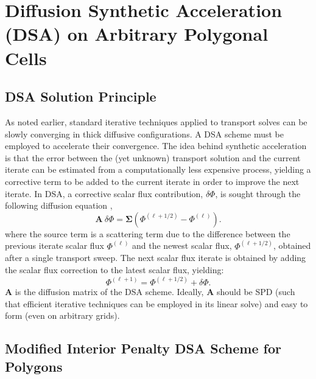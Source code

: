 \documentclass[preprint,10pt]{elsarticle}
\newcommand\bs{\boldsymbol}
\renewcommand{\(}{\left(}
\renewcommand{\)}{\right)}
\renewcommand{\[}{\left[}
\renewcommand{\]}{\right]}
\begin{document}
\section{Diffusion Synthetic Acceleration (DSA) on Arbitrary Polygonal Cells} \label{sec_mip}

\subsection{DSA Solution Principle}

As noted earlier, standard iterative techniques applied to transport solves 
can be slowly converging in thick diffusive configurations. A DSA scheme 
must be employed to accelerate their convergence.
The idea behind synthetic acceleration is that the error between the (yet
unknown) transport solution and the current iterate can be estimated from a
computationally less expensive process, yielding a corrective term to be added
to the current iterate in order to improve the next iterate. In DSA, a
corrective scalar flux contribution, $\delta \Phi$, is sought through the following 
diffusion equation \cite{dsa_ref}, 
\begin{equation}
  \bs{A}\ \delta \Phi = \bs{\Sigma}\(\Phi^{(\ell+1/2)} - \Phi^{(\ell)}\).
\end{equation}
where the source term is a scattering term due to the
difference between the previous iterate scalar flux $\Phi^{(\ell)}$ and the
newest scalar flux, $\Phi^{(\ell+1/2)}$, obtained after a single transport sweep. 
The next scalar flux iterate is obtained by adding the scalar flux correction to
the latest scalar flux, yielding:
\begin{equation}
  \Phi^{(\ell+1)} = \Phi^{(\ell+1/2)}+\delta \Phi.
\end{equation}
$\bs{A}$ is the diffusion matrix of the DSA scheme.
Ideally, $\bs{A}$ should be SPD (such that efficient iterative techniques can 
be employed in its linear solve) and easy to form (even on arbitrary grids).

\subsection{Modified Interior Penalty DSA Scheme for Polygons}
\end{document}
